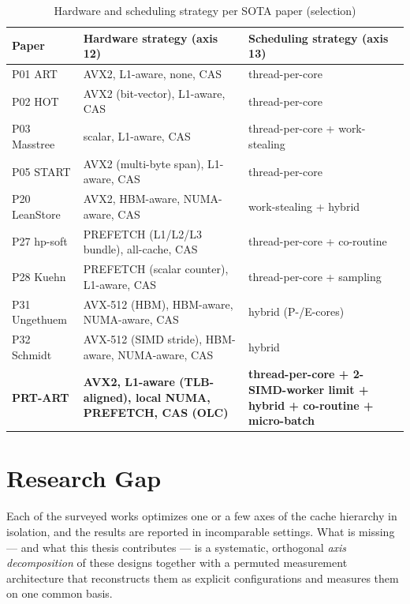 \begin{table}[h!]
\centering\small
\caption{Hardware and scheduling strategy per SOTA paper (selection)}\label{tab:hw-sched}
\begin{tabular}{lll}
\toprule
\textbf{Paper} & \textbf{Hardware strategy (axis 12)} & \textbf{Scheduling strategy (axis 13)} \\
\midrule
P01 ART & AVX2, L1-aware, none, CAS & thread-per-core \\
P02 HOT & AVX2 (bit-vector), L1-aware, CAS & thread-per-core \\
P03 Masstree & scalar, L1-aware, CAS & thread-per-core + work-stealing \\
P05 START & AVX2 (multi-byte span), L1-aware, CAS & thread-per-core \\
P20 LeanStore & AVX2, HBM-aware, NUMA-aware, CAS & work-stealing + hybrid \\
P27 hp-soft & PREFETCH (L1/L2/L3 bundle), all-cache, CAS & thread-per-core + co-routine \\
P28 Kuehn & PREFETCH (scalar counter), L1-aware, CAS & thread-per-core + sampling \\
P31 Ungethuem & AVX-512 (HBM), HBM-aware, NUMA-aware, CAS & hybrid (P-/E-cores) \\
P32 Schmidt & AVX-512 (SIMD stride), HBM-aware, NUMA-aware, CAS & hybrid \\
\midrule
\textbf{PRT-ART} & \textbf{AVX2, L1-aware (TLB-aligned), local NUMA, PREFETCH, CAS (OLC)} & \textbf{thread-per-core + 2-SIMD-worker limit + hybrid + co-routine + micro-batch} \\
\bottomrule
\end{tabular}
\end{table}

\section{Research Gap}\label{sec:gap}

Each of the surveyed works optimizes one or a few axes of the cache hierarchy in
isolation, and the results are reported in incomparable settings. What is missing --- and
what this thesis contributes --- is a systematic, orthogonal \emph{axis decomposition} of
these designs together with a permuted measurement architecture that reconstructs them as
explicit configurations and measures them on one common basis.
